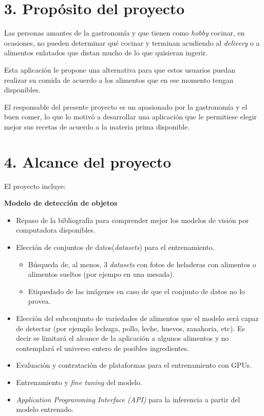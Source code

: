 \documentclass[
11pt, %
]{charter}
\begin{document}
\section{3. Propósito del proyecto}
\label{sec:proposito}
Las personas amantes de la gastronomía y que tienen como \textit{hobby} cocinar, en ocasiones, no pueden determinar qué cocinar y terminan acudiendo al \textit{delivery} o a alimentos enlatados que distan mucho de lo que quisieran ingerir.

Esta aplicación le propone una alternativa para que estos usuarios puedan realizar su comida de acuerdo a los alimentos que en ese momento tengan disponibles.

El responsable del presente proyecto es un apasionado por la gastronomía y el buen comer, lo que lo motivó a desarrollar una aplicación que le permitiese elegir mejor sus recetas de acuerdo a la materia prima disponible.

\section{4. Alcance del proyecto}
\label{sec:alcance}
El proyecto incluye:

\textbf{Modelo de detección de objetos}
\begin{itemize}
	\item Repaso de la bibliografía para comprender mejor los modelos de visión por computadora disponibles.
	\item Elección de conjuntos de datos(\textit{datasets}) para el entrenamiento.
		\begin{itemize}
		\item Búsqueda de, al menos, 3 \textit{datasets} con fotos de heladeras con alimentos o alimentos sueltos (por ejempo en una mesada).
		\item Etiquedado de las imágenes en caso de que el conjunto de datos no lo provea.
		\end{itemize}
	\item Elección del subconjunto de variedades de alimentos que el modelo será capaz de detectar (por ejemplo lechuga, pollo, leche, huevos, zanahoria, etc). Es decir se limitará el alcance de la aplicación a algunos alimentos y no contemplará el universo entero de posibles ingredientes.
	\item Evaluación y contratación de plataformas para el entrenamiento con GPUs.
	\item Entrenamiento y \textit{fine tuning} del modelo.
	\item \textit{Application Programming Interface (API)} para la inferencia a partir del modelo entrenado.
\end{itemize}
\end{document}
